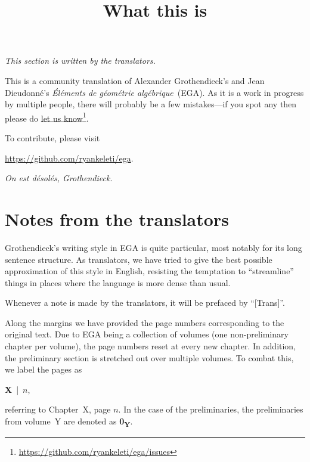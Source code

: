 


\title{What this is}
\maketitle

\label{section-phantom}

\noindent
\emph{This section is written by the translators.}

\noindent
This is a community translation of Alexander Grothendieck's and Jean Dieudonn\'e's \emph{\'El\'ements de g\'eom\'etrie alg\'ebrique}~(EGA).
As it is a work in progress by multiple people, there will probably be a few mistakes---if you spot any then please do \href{https://github.com/ryankeleti/ega/issues}{let us know}\footnote{\url{https://github.com/ryankeleti/ega/issues}}.

\noindent
To contribute, please visit
\begin{center}
  \url{https://github.com/ryankeleti/ega}.
\end{center}

\noindent
\emph{On est d\'esol\'es, Grothendieck.}

\section*{Notes from the translators}
Grothendieck's writing style in EGA is quite particular, most notably for its long sentence structure.
As translators, we have tried to give the best possible approximation of this style in English, resisting the temptation to ``streamline'' things in places where the language is more dense than usual.

\sectionbreak

Whenever a note is made by the translators, it will be prefaced by ``[Trans]''.

\sectionbreak

Along the margins we have provided the page numbers corresponding to the original text.
Due to EGA being a collection of volumes (one non-preliminary chapter per volume), the page numbers reset at every new chapter.
In addition, the preliminary section is stretched out over multiple volumes.
To combat this, we label the pages as
\begin{center}
  \textbf{X}~|~$n$,
\end{center}
referring to Chapter~X, page $n$.
In the case of the preliminaries, the preliminaries from volume~Y are denoted as \textbf{0\textsubscript{Y}}.

